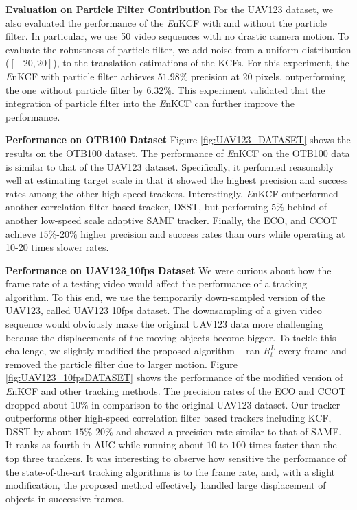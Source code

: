 \documentclass[10pt,twocolumn,letterpaper]{article}
\begin{document}
\textbf{Evaluation on Particle Filter Contribution} For the UAV123
dataset, we also evaluated the performance of the {\it E}nKCF with and
without the particle filter. In particular, we use 50 video sequences
with no drastic camera motion. To evaluate the robustness of particle
filter, we add noise from a uniform distribution ($[-20,20]$), to the
translation estimations of the KCFs. For this experiment, the {\it
  E}nKCF with particle filter achieves $51.98\%$ precision at 20
pixels, outperforming the one without particle filter by
$6.32\%$. This experiment validated that the integration of particle
filter into the {\it E}nKCF can further improve the performance.

\textbf{Performance on OTB100 Dataset} Figure \ref{fig:UAV123_DATASET}
shows the results on the OTB100 dataset. The performance of {\it
  E}nKCF on the OTB100 data is similar to that of the UAV123
dataset. Specifically, it performed reasonably well at estimating
target scale in that it showed the highest precision and success rates
among the other high-speed trackers. Interestingly, {\it E}nKCF
outperformed another correlation filter based tracker, DSST, but
performing $5\%$ behind of another low-speed scale adaptive SAMF
tracker. Finally, the ECO, and CCOT achieve $15\%$-$20\%$ higher
precision and success rates than ours while operating at 10-20 times
slower rates.

\textbf{Performance on UAV123$\_$10fps Dataset} We were curious about
how the frame rate of a testing video would affect the performance of
a tracking algorithm. To this end, we use the temporarily down-sampled
version of the UAV123, called UAV123$\_$10fps dataset. The
downsampling of a given video sequence would obviously make the
original UAV123 data more challenging because the displacements of the
moving objects become bigger. To tackle this challenge, we slightly
modified the proposed algorithm -- ran $R_{t}^{L}$ every frame and
removed the particle filter due to larger motion. Figure
\ref{fig:UAV123_10fpsDATASET} shows the performance of the modified
version of {\it E}nKCF and other tracking methods. The precision rates
of the ECO and CCOT dropped about $10\%$ in comparison to the original
UAV123 dataset. Our tracker outperforms other high-speed correlation
filter based trackers including KCF, DSST by about $15\%$-$20\%$ and
showed a precision rate similar to that of SAMF. It ranks as fourth in
AUC while running about $10$ to $100$ times faster than the top three
trackers. It was interesting to observe how sensitive the performance
of the state-of-the-art tracking algorithms is to the frame rate, and,
with a slight modification, the proposed method effectively handled
large displacement of objects in successive frames.
\end{document}
